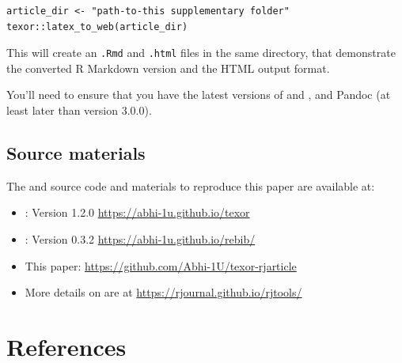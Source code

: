 \begin{verbatim}
article_dir <- "path-to-this supplementary folder"
texor::latex_to_web(article_dir)
\end{verbatim}

This will create an \texttt{.Rmd} and \texttt{.html} files in the same directory, that demonstrate the converted R Markdown version and the HTML output format.

You'll need to ensure that you have the latest versions of  and , and Pandoc (at least later than version 3.0.0).

\hypertarget{source-materials}{%
\subsection*{Source materials}\label{source-materials}}

The  and  source code and materials to reproduce this paper are available at:

\begin{itemize}
\tightlist
\item
  : Version 1.2.0 \url{https://abhi-1u.github.io/texor}
\item
  : Version 0.3.2 \url{https://abhi-1u.github.io/rebib/}
\item
  This paper: \url{https://github.com/Abhi-1U/texor-rjarticle}
\item
  More details on  are at \url{https://rjournal.github.io/rjtools/}
\end{itemize}

\hypertarget{references}{%
\section*{References}\label{references}}

